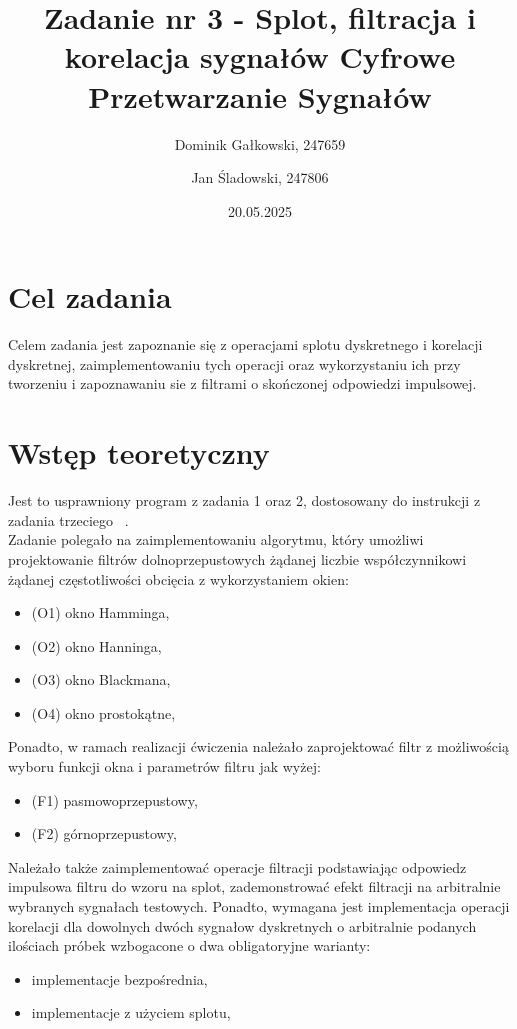 \documentclass{article}
\title{{\bf Zadanie nr 3 - Splot, filtracja i korelacja sygnałów}\linebreak
Cyfrowe Przetwarzanie Sygnałów}
\author{Dominik Gałkowski, 247659 \and Jan Śladowski, 247806}
\date{20.05.2025}
\begin{document}
\clearpage\maketitle
\thispagestyle{empty}
\newpage
\setcounter{page}{1}
\section{Cel zadania}

Celem zadania jest zapoznanie się z operacjami splotu dyskretnego i korelacji
dyskretnej, zaimplementowaniu tych operacji oraz wykorzystaniu ich przy
tworzeniu i zapoznawaniu sie z filtrami o skończonej odpowiedzi impulsowej.
\section{Wstęp teoretyczny}

Jest to usprawniony program z zadania 1 oraz 2, dostosowany do instrukcji z zadania trzeciego ~\cite{instrukcja}. \\

Zadanie polegało na zaimplementowaniu algorytmu, który umożliwi projektowanie filtrów dolnoprzepustowych żądanej liczbie współczynnikowi żądanej częstotliwości obcięcia z wykorzystaniem okien:
\begin{itemize}
	\item (O1) okno Hamminga,
	\item (O2) okno Hanninga,
	\item (O3) okno Blackmana,
	\item (O4) okno prostokątne,
\end{itemize}

Ponadto, w ramach realizacji ćwiczenia należało zaprojektować filtr z możliwością wyboru funkcji okna i parametrów filtru jak wyżej:
\begin{itemize}
	\item (F1) pasmowoprzepustowy,
	\item (F2) górnoprzepustowy,
\end{itemize} 

Należało także zaimplementować operacje filtracji podstawiając odpowiedz impulsowa filtru do wzoru na splot, zademonstrować efekt filtracji na arbitralnie wybranych sygnałach testowych. Ponadto, wymagana jest implementacja operacji korelacji dla dowolnych dwóch sygnałow dyskretnych o arbitralnie podanych ilościach próbek wzbogacone o dwa obligatoryjne warianty:
\begin{itemize}
	\item implementacje bezpośrednia,
	\item implementacje z użyciem splotu,
\end{itemize}
\end{document}
